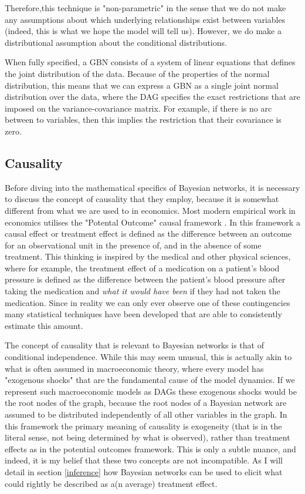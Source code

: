 \documentclass{article}
\begin{document}
Therefore,this technique is "non-parametric" in the sense that we do not make any assumptions about which underlying relationships exist between variables (indeed, this is what we hope the model will tell us). However, we do make a distributional assumption about the conditional distributions.

When fully specified, a GBN consists of a system of linear equations that defines the joint distribution of the data. Because of the properties of the normal distribution, this means that we can express a GBN as a single joint normal distribution over the data, where the DAG specifies the exact restrictions that are imposed on the variance-covariance matrix. For example, if there is no arc between to variables, then this implies the restriction that their covariance is zero.

\subsection{Causality}

Before diving into the mathematical specifics of Bayesian networks, it is necessary to discuss the concept of causality that they employ, because it is somewhat different from what we are used to in economics. Most modern empirical work in economics utilises the "Potental Outcome" causal framework \parencite{holland1986statistics}. In this framework a causal effect or treatment effect is defined as the difference between an outcome for an observational unit in the presence of, and in the absence of some treatment. This thinking is inspired by the medical and other physical sciences, where for example, the treatment effect of a medication on a patient's blood pressure is defined as the difference between the patient's blood pressure after taking the medication and \textit{what it would have been} if they had not taken the medication. Since in reality we can only ever observe one of these contingencies many statistical techniques have been developed that are able to consistently estimate this amount.

The concept of causality that is relevant to Bayesian networks is that of conditional independence. While this may seem unusual, this is actually akin to what is often assumed in macroeconomic theory, where every model has "exogenous shocks" that are the fundamental cause of the model dynamics. If we represent such macroeconomic models as DAGs these exogenous shocks would be the root nodes of the graph, because the root nodes of a Bayesian network are assumed to be distributed independently of all other variables in the graph. In this framework the primary meaning of causality is exogeneity (that is in the literal sense, not being determined by what is observed), rather than treatment effects as in the potential outcomes framework. This is only a subtle nuance, and indeed, it is my belief that these two concepts are not incompatible. As I will detail in section \ref{inference} how Bayesian networks can be used to elicit what could rightly be described as a(n average) treatment effect.
\end{document}
